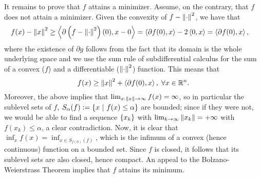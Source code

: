 \documentclass[10pt]{article}
\begin{document}
\begin{Answer}
	It remains to prove that $f$ attains a minimizer. Assume, on the contrary,
	that $f$ does not attain a minimizer. Given the convexity of $f -
	\left \| \cdot \right \|^2$, we have that
	\begin{align*}
		f(x) - \left \| x \right \|^2 &\geq \left\langle \partial \left(f - \left \| \cdot \right \|^2
		\right)(0), x - 0 \right\rangle = \left\langle \partial f(0), x \right\rangle - 2 \left\langle 0, x \right\rangle =
		\left\langle \partial f(0), x \right\rangle,
	\end{align*}
	where the existence of $\partial g$ follows from the fact that its domain
	is the whole underlying space and we use the sum rule of subdifferential
	calculus for the sum of a convex ($f$) and a differentiable
	($\left \| \cdot \right \|^2$) function. This means that
	\[
		f(x) \geq \left \| x \right \|^2 + \left\langle \partial f(0), x \right\rangle, \; \forall x \in \mathbb{R}^n.
	\]
	Moreover, the above implies that $\lim_{x: \left \| x \right \| \to \infty}
	f(x) = \infty$, so in particular the sublevel sets of $f$,
	$S_{\alpha}(f) := \left\{ x \ \middle| \  f(x) \leq \alpha \right\}$ are bounded;
	since if they were not, we would be able to find a sequence $\left\{ x_k \right\}$
	with $\lim_{k \to \infty} \left \| x_k \right \| = +\infty$ with $f(x_k) \leq \alpha$,
	a clear contradiction. Now, it is clear that $\inf_x f(x) = \inf_{x \in
	S_{f(0)}(f)}$, which is the infimum of a convex (hence continuous) function
	on a bounded set. Since $f$ is closed, it follows that its sublevel sets
	are also closed, hence compact. An appeal to the Bolzano-Weierstrass
	Theorem implies that $f$ attains its minimum.
\end{Answer}




\end{document}
